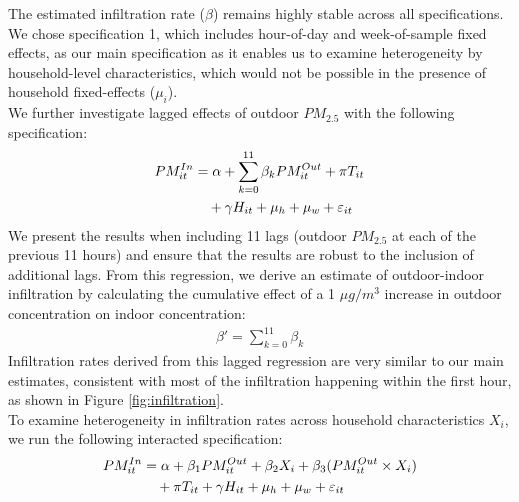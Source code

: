 \documentclass[9pt,twocolumn,twoside]{pnas-new}
\begin{document}
The estimated infiltration rate ($\beta$) remains highly stable across all specifications. We chose specification 1, which includes hour-of-day and week-of-sample fixed effects, as our main specification as it enables us to examine heterogeneity by household-level characteristics, which would not be possible in the presence of household fixed-effects ($\mu_i$). 
\\ 

We further investigate lagged effects of outdoor $PM_{2.5}$ with the following specification:
\begin{align}
     PM^{In}_{it} &= \alpha + \sum_{k = 0}^{11}\beta_k PM^{Out}_{it} + \pi T_{it} \\ &\quad + \gamma H_{it} +\mu_h + \mu_w + \varepsilon_{it} \notag
\end{align}
We present the results when including 11 lags (outdoor $PM_{2.5}$ at each of the previous 11 hours) and ensure that the results are robust to the inclusion of additional lags. From this regression, we derive an estimate of outdoor-indoor infiltration by calculating the cumulative effect of a 1 $\mu g/m^3$ increase in outdoor concentration on indoor concentration:
\begin{align}
    \beta' = \sum_{k=0}^11 \beta_k
\end{align}
Infiltration rates derived from this lagged regression are very similar to our main estimates, consistent with most of the infiltration happening within the first hour, as shown in Figure \ref{fig:infiltration}.
\\

To examine heterogeneity in infiltration rates across household characteristics $X_i$, we run the following interacted specification:
\begin{align}
    PM^{In}_{it} &= \alpha + \beta_1 PM^{Out}_{it} + \beta_2 X_i + \beta_3(PM^{Out}_{it} \times X_i) \\ 
    &\quad + \pi T_{it} + \gamma H_{it} + \mu_h + \mu_w + \varepsilon_{it} \notag
\end{align}

\end{document}
